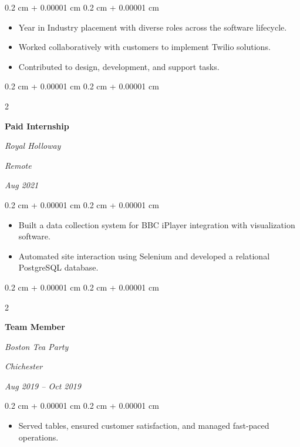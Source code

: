 \documentclass[10pt, letterpaper]{article}
\newenvironment{highlights}{
    \begin{itemize}[
        topsep=0.10 cm,
        parsep=0.10 cm,
        partopsep=0pt,
        itemsep=0pt,
        leftmargin=0.4 cm + 10pt
    ]
}{
    \end{itemize}
} %
\newenvironment{onecolentry}{
    \begin{adjustwidth}{
        0.2 cm + 0.00001 cm
    }{
        0.2 cm + 0.00001 cm
    }
}{
    \end{adjustwidth}
} %
\newenvironment{twocolentry}[2][]{
    \onecolentry
    \def\secondColumn{#2}
    \setcolumnwidth{\fill, 4.5 cm}
    \begin{paracol}{2}
}{
    \switchcolumn \raggedleft \secondColumn
    \end{paracol}
    \endonecolentry
} %
\begin{document}
        \vspace{0.10 cm}
        \begin{onecolentry}
            \begin{highlights}
                \item Year in Industry placement with diverse roles across the software lifecycle.
                \item Worked collaboratively with customers to implement Twilio solutions.
                \item Contributed to design, development, and support tasks.
            \end{highlights}
        \end{onecolentry}


        \vspace{0.2 cm}

        \begin{twocolentry}{
        \textit{Remote}    
            
        \textit{Aug 2021}}
            \textbf{Paid Internship}
            
            \textit{Royal Holloway}
        \end{twocolentry}

        \vspace{0.10 cm}
        \begin{onecolentry}
            \begin{highlights}
                \item Built a data collection system for BBC iPlayer integration with visualization software.
                \item Automated site interaction using Selenium and developed a relational PostgreSQL database.
            \end{highlights}
        \end{onecolentry}


        \vspace{0.2 cm}

        \begin{twocolentry}{
        \textit{Chichester}    
            
        \textit{Aug 2019 – Oct 2019}}
            \textbf{Team Member}
            
            \textit{Boston Tea Party}
        \end{twocolentry}

        \vspace{0.10 cm}
        \begin{onecolentry}
            \begin{highlights}
                \item Served tables, ensured customer satisfaction, and managed fast-paced operations.
            \end{highlights}
        \end{onecolentry}
\end{document}
